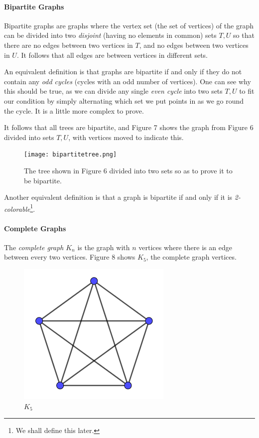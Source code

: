 \paragraph{Bipartite Graphs}

Bipartite graphs are graphs where the vertex set (the set of vertices) of the graph can be divided into two \textit{disjoint} (having no elements in common) sets \(T,U\) so that there are no edges between two vertices in \(T\), and no edges between two vertices in \(U\). It follows that all edges are between vertices in different sets.

An equivalent definition is that graphs are bipartite if and only if they do not contain any \textit{odd cycles} (cycles with an odd number of vertices). One can see why this should be true, as we can divide any single \textit{even cycle} into two sets \(T,U\) to fit our condition by simply alternating which set we put points in as we go round the cycle. It is a little more complex to prove.

It follows that all trees are bipartite, and Figure 7 shows the graph from Figure 6 divided into sets \(T,U\), with vertices moved to indicate this.



\begin{figure}[h]
\centering
\texttt{[image: bipartitetree.png]}
\caption{The tree shown in Figure 6 divided into two sets so as to prove it to be bipartite.}
\label{bipartitetree}
\end{figure}



Another equivalent definition is that a graph is bipartite if and only if it is \textit{2-colorable}\footnote{We shall define this later.}.

\paragraph{Complete Graphs}

The \textit{complete graph} \(K_n\) is the graph with \(n\) vertices where there is an edge between every two vertices. Figure 8 shows \(K_5\), the complete graph vertices.



\begin{figure}[h]
\centering
\includegraphics{k5graph.png}
\caption{\(K_5\)}
\label{k5graph}
\end{figure}



